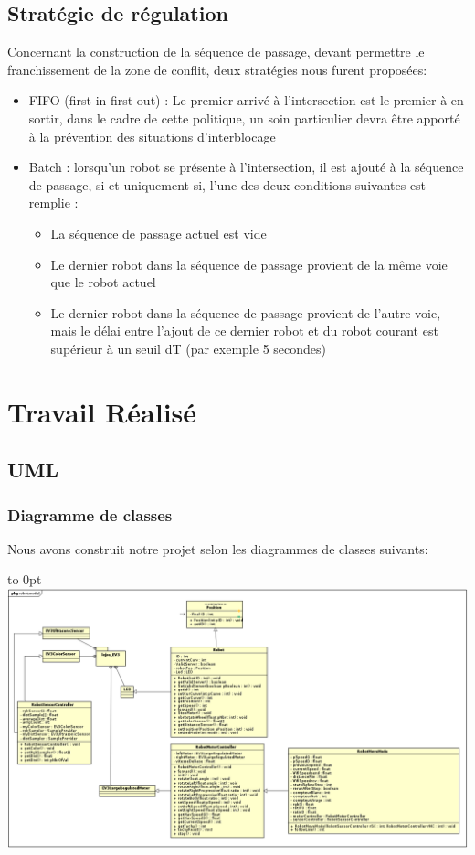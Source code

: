\documentclass[french,a4paper,12pt]{report}
\begin{document}
\chapter{Stratégie de régulation}
Concernant la construction de la séquence de passage, devant permettre le franchissement de la zone de conflit, deux stratégies nous furent proposées:

\begin{itemize}
\item FIFO (first-in first-out) : 
	Le premier arrivé à l’intersection est le premier à en sortir, dans le cadre de cette
	politique, un soin particulier devra être apporté à la prévention des situations d’interblocage
	
\item Batch : lorsqu’un robot se présente à l’intersection, il est ajouté à la séquence de passage, si et
	uniquement si, l’une des deux conditions suivantes est remplie :
	\begin{itemize}
	\item La séquence de passage actuel est vide
	\item Le dernier robot dans la séquence de passage provient de la même voie que le robot actuel
	\item Le dernier robot dans la séquence de passage provient de l’autre voie, mais le délai entre l’ajout
		de ce dernier robot et du robot courant est supérieur à un seuil dT (par exemple 5 secondes)
	\end{itemize}
\end{itemize}


\part{Travail Réalisé}

\chapter{UML}

\section{Diagramme de classes}
Nous avons construit notre projet selon les diagrammes de classes suivants:\newline

\hfill\hbox to 0pt{\hss\includegraphics[width=20cm]{robotmodel.png}\hss}\hfill\null\newline
\end{document}
